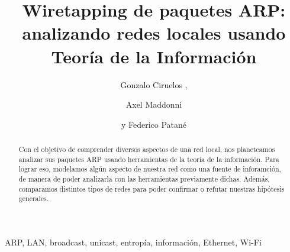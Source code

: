 \documentclass[%
	final, %
	notitlepage,
	narroweqnarray,
	inline,
	twoside,
	]{ieee}
\begin{document}
\title[Wiretapping de paquetes ARP]{%
	Wiretapping de paquetes ARP: analizando redes locales usando Teor\'ia de la Informaci\'on
}

\author[CIRUELOS, MADDONI, PATAN\'E]{
Gonzalo Ciruelos ,
\and{}Axel Maddonni%
\and{}y Federico Patan\'e
}



\maketitle               


\begin{abstract} 
Con el objetivo de comprender diversos aspectos de una red local, nos planeteamos analizar sus paquetes ARP usando herramientas de la teor\'ia de la informaci\'on.
Para lograr eso, modelamos alg\'un aspecto de nuestra red como una fuente de inforamci\'on, de manera de poder analizarla con las herramientas previamente dichas.
Adem\'as, comparamos distintos tipos de redes para poder confirmar o refutar nuestras hip\'otesis generales.
\end{abstract}

\begin{keywords}
ARP, LAN, broadcast, unicast, entrop\'ia, informaci\'on, Ethernet, Wi-Fi
\end{keywords}


% 

% 

% 

% 

% 

\end{document}
